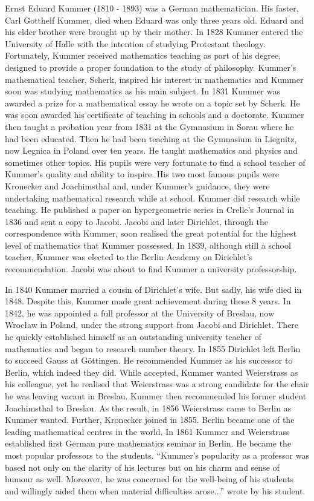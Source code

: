 \documentclass[b5paper]{article}
\begin{document}
\begin{mdframed}
Ernst Eduard Kummer  (1810 - 1893) was a German mathematician. His faster, Carl Gotthelf Kummer, died when Eduard was only three years old. Eduard and his elder brother were brought up by their mother. In 1828 Kummer entered the University of Halle with the intention of studying Protestant theology. Fortunately, Kummer received mathematics teaching as part of his degree, designed to provide a proper foundation to the study of philosophy. Kummer's mathematical teacher, Scherk, inspired his interest in mathematics and Kummer soon was studying mathematics as his main subject. In 1831 Kummer was awarded a prize for a mathematical essay he wrote on a topic set by Scherk. He was soon awarded his certificate of teaching in schools and a doctorate. Kummer then taught a probation year from 1831 at the Gymnasium in Sorau where he had been educated. Then he had been teaching at the Gymnasium in Liegnitz, now Legnica in Poland over ten years. He taught mathematics and physics and sometimes other topics. His pupils were very fortunate to find a school teacher of Kummer's quality and ability to inspire. His two most famous pupils were Kronecker and Joachimsthal and, under Kummer's guidance, they were undertaking mathematical research while at school. Kummer did research while teaching. He published a paper on hypergeometric series in Crelle's Journal in 1836 and sent a copy to Jacobi. Jacobi and later Dirichlet, through the correspondence with Kummer, soon realised the great potential for the highest level of mathematics that Kummer possessed. In 1839, although still a school teacher, Kummer was elected to the Berlin Academy on Dirichlet's recommendation. Jacobi was about to find Kummer a university professorship.

In 1840 Kummer married a cousin of Dirichlet's wife. But sadly, his wife died in 1848. Despite this, Kummer made great achievement during these 8 years. In 1842, he was appointed a full professor at the University of Breslau, now Wrocław in Poland, under the strong support from Jacobi and Dirichlet. There he quickly established himself as an outstanding university teacher of mathematics and began to research number theory. In 1855 Dirichlet left Berlin to succeed Gauss at Göttingen. He recommended Kummer as his successor to Berlin, which indeed they did. While accepted, Kummer wanted Weierstrass as his colleague, yet he realised that Weierstrass was a strong candidate for the chair he was leaving vacant in Breslau. Kummer then recommended his former student Joachimsthal to Breslau. As the result, in 1856 Weierstrass came to Berlin as Kummer wanted. Further, Kronecker joined in 1855. Berlin became one of the leading mathematical centres in the world. In 1861 Kummer and Weierstrass established first German pure mathematics seminar in Berlin. He became the most popular professors to the students. \enquote{Kummer's popularity as a professor was based not only on the clarity of his lectures but on his charm and sense of humour as well. Moreover, he was concerned for the well-being of his students and willingly aided them when material difficulties arose...} wrote by his student.


\end{mdframed}
\end{document}
